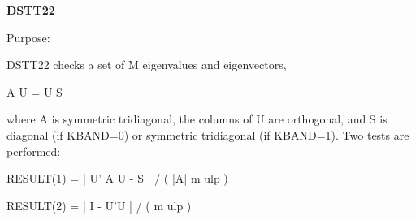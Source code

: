 {\bfseries D\+S\+T\+T22} 

\begin{DoxyParagraph}{Purpose\+: }
\begin{DoxyVerb} DSTT22  checks a set of M eigenvalues and eigenvectors,

     A U = U S

 where A is symmetric tridiagonal, the columns of U are orthogonal,
 and S is diagonal (if KBAND=0) or symmetric tridiagonal (if KBAND=1).
 Two tests are performed:

    RESULT(1) = | U' A U - S | / ( |A| m ulp )

    RESULT(2) = | I - U'U | / ( m ulp )\end{DoxyVerb}
 
\end{DoxyParagraph}

